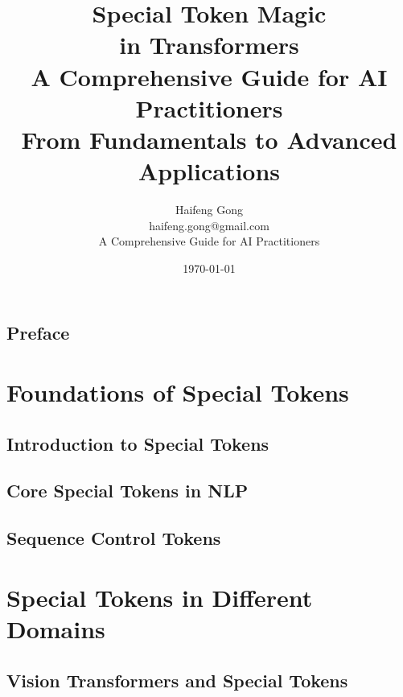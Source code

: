 \documentclass[11pt,oneside]{book}
\title{{\Huge \textbf{Special Token Magic\\in Transformers}}\\[0.5cm]
{\Large A Comprehensive Guide for AI Practitioners}\\[1cm]
{\large From Fundamentals to Advanced Applications}}
\author{{\Large Haifeng Gong}\\[0.3cm]
{\normalsize haifeng.gong@gmail.com}\\[0.5cm]
{\small A Comprehensive Guide for AI Practitioners}}
\date{\today}
\theoremstyle{definition}
\theoremstyle{plain}
\theoremstyle{remark}
\begin{document}
\frontmatter
\maketitle

\tableofcontents

\chapter{Preface}


\mainmatter

\part{Foundations of Special Tokens}

\chapter{Introduction to Special Tokens}






\chapter{Core Special Tokens in NLP}





\chapter{Sequence Control Tokens}





\part{Special Tokens in Different Domains}

\chapter{Vision Transformers and Special Tokens}





\end{document}
